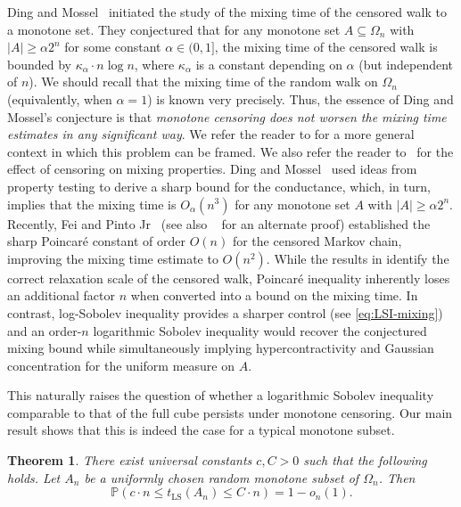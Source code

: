 \documentclass[12pt,final]{amsart}
\newcommand{\1}{\mathbf{1}}
\newtheorem{theorem}{Theorem}[section]
\begin{document}
Ding and Mossel~\cite{ding2014mixing} initiated the study of the mixing time of the censored walk to a monotone set. They conjectured that for any monotone set $A\subseteq \Omega_n$ with $|A|\geq \alpha 2^{n}$ for some constant $\alpha \in (0, 1]$, the mixing time of the censored walk is bounded by $\kappa_\alpha\cdot n\log n$, where $\kappa_\alpha $ is a constant depending on $\alpha$ (but independent of $n$). We should recall that the mixing time of the random walk on $\Omega_n$ (equivalently, when $\alpha =1$) is known very precisely. Thus, the essence of Ding and Mossel's conjecture is that \emph{monotone censoring does not worsen the mixing time estimates in any significant way}. We refer the reader to \cite[Section 5.3.2]{fathi2019quelques} for a more general context in which this problem can be framed. We also refer the reader to~\cite{FK13, Hol11} for the effect of censoring on mixing properties. 
Ding and Mossel~\cite{ding2014mixing} used ideas from property testing to derive a sharp bound for the conductance, which, in turn, implies that the mixing time is $O_{\alpha }(n^3)$ for any monotone set $A$ with $|A|\geq \alpha 2^{n}$. Recently, Fei and Pinto Jr~\cite{fei2025spectral} (see also ~\cite{chang2025poincar} for an alternate proof) established the sharp Poincar\'e constant of order $O(n)$ for the censored Markov chain, improving the mixing time estimate to $O(n^2)$.  
While the results in \cite{fei2025spectral, chang2025poincar} identify the correct relaxation scale of the censored walk, Poincar\'e inequality inherently loses an additional factor $n$ when converted into a bound on the mixing time. In contrast, log-Sobolev inequality provides a sharper control (see \eqref{eq:LSI-mixing}) and an order-$n$ logarithmic Sobolev inequality would recover the conjectured mixing bound while simultaneously implying hypercontractivity and Gaussian concentration for the uniform measure on $A$. 

This naturally raises the question of whether a logarithmic Sobolev inequality comparable to that of the full cube persists under monotone censoring. 
Our main result shows that this is indeed the case for a typical monotone subset. 

\begin{theorem}
\label{thm:highprobLSI}
    There exist universal constants $c, C>0$ such that the following holds. Let $A_n$ be a uniformly chosen random monotone subset of $\Omega_n$. Then
    \[
    \mathbb{P}\left(c\cdot n\leq  t_{\operatorname{LS}}(A_n)\leq C\cdot n\right) = 1-o_n(1).
    \]
\end{theorem}
\end{document}
